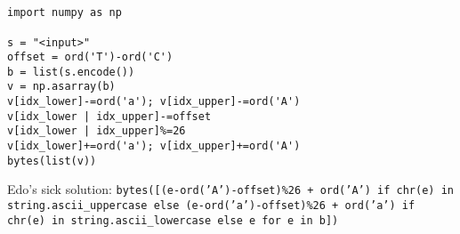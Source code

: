 \section{}
\begin{verbatim}
import numpy as np

s = "<input>"
offset = ord('T')-ord('C')
b = list(s.encode())
v = np.asarray(b)
v[idx_lower]-=ord('a'); v[idx_upper]-=ord('A')
v[idx_lower | idx_upper]-=offset
v[idx_lower | idx_upper]%=26
v[idx_lower]+=ord('a'); v[idx_upper]+=ord('A')
bytes(list(v))
\end{verbatim} 

Edo's sick solution: \texttt{bytes([(e-ord('A')-offset)\%26 + ord('A') if chr(e) in string.ascii_uppercase else (e-ord('a')-offset)\%26 + ord('a') if chr(e) in string.ascii_lowercase else e for e in b])}